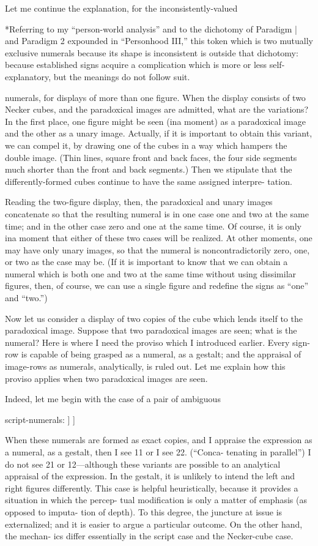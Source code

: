 Let me continue the explanation, for the inconsistently-valued 


*Referring to my “person-world analysis” and to the dichotomy of 
Paradigm | and Paradigm 2 expounded in “Personhood III,” this token which 
is two mutually exclusive numerals because its shape is inconsistent is outside 
that dichotomy: because established signs acquire a complication which is 
more or less self-explanatory, but the meanings do not follow suit. 


numerals, for displays of more than one figure. When the display 
consists of two Necker cubes, and the paradoxical images are admitted, 
what are the variations? In the first place, one figure might be seen (ina 
moment) as a paradoxical image and the other as a unary image. 
Actually, if it is important to obtain this variant, we can compel it, by 
drawing one of the cubes in a way which hampers the double image. 
(Thin lines, square front and back faces, the four side segments much 
shorter than the front and back segments.) Then we stipulate that the 
differently-formed cubes continue to have the same assigned interpre- 
tation. 


Reading the two-figure display, then, the paradoxical and unary 
images concatenate so that the resulting numeral is in one case one and 
two at the same time; and in the other case zero and one at the same 
time. Of course, it is only ina moment that either of these two cases will 
be realized. At other moments, one may have only unary images, so 
that the numeral is noncontradictorily zero, one, or two as the case may 
be. (If it is important to know that we can obtain a numeral which is 
both one and two at the same time without using dissimilar figures, 
then, of course, we can use a single figure and redefine the signs as “one” 
and “two.”) 

Now let us consider a display of two copies of the cube which lends 
itself to the paradoxical image. Suppose that two paradoxical images 
are seen; what is the numeral? Here is where I need the proviso which I 
introduced earlier. Every sign-row is capable of being grasped as a 
numeral, as a gestalt; and the appraisal of image-rows as numerals, 
analytically, is ruled out. Let me explain how this proviso applies when 
two paradoxical images are seen. 

Indeed, let me begin with the case of a pair of ambiguous 


script-numerals: ] ] 


When these numerals are formed as exact copies, and I appraise the 
expression as a numeral, as a gestalt, then I see 11 or I see 22. (“Conca- 
tenating in parallel”) I do not see 21 or 12—although these variants are 
possible to an analytical appraisal of the expression. In the gestalt, it is 
unlikely to intend the left and right figures differently. This case is 
helpful heuristically, because it provides a situation in which the percep- 
tual modification is only a matter of emphasis (as opposed to imputa- 
tion of depth). To this degree, the juncture at issue is externalized; and it 
is easier to argue a particular outcome. On the other hand, the mechan- 
ics differ essentially in the script case and the Necker-cube case. 

